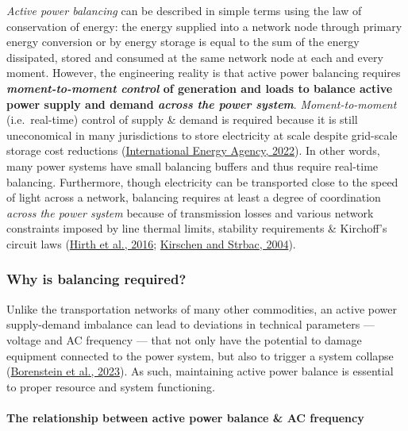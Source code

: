 \documentclass[12pt,a4paper,]{report}
\begin{document}
\emph{Active power balancing} can be described in simple terms using the
law of conservation of energy: the energy supplied into a network node
through primary energy conversion or by energy storage is equal to the
sum of the energy dissipated, stored and consumed at the same network
node at each and every moment. However, the engineering reality is that
active power balancing requires \textbf{\emph{moment-to-moment control}
of generation and loads to balance active power supply and demand
\emph{across the power system}}. \emph{Moment-to-moment}
(i.e.~real-time) control of supply \& demand is required because it is
still uneconomical in many jurisdictions to store electricity at scale
despite grid-scale storage cost reductions
(\protect\hyperlink{ref-internationalenergyagencyGridScaleStorage2022}{International
Energy Agency, 2022}). In other words, many power systems have small
balancing buffers and thus require real-time balancing. Furthermore,
though electricity can be transported close to the speed of light across
a network, balancing requires at least a degree of coordination
\emph{across the power system} because of transmission losses and
various network constraints imposed by line thermal limits, stability
requirements \& Kirchoff's circuit laws
(\protect\hyperlink{ref-hirthWhyWindNot2016a}{Hirth et al., 2016};
\protect\hyperlink{ref-kirschenFundamentalsPowerSystem2004}{Kirschen and
Strbac, 2004}).

\hypertarget{sec:lit_review-balancing_need}{%
\subsubsection{Why is balancing
required?}\label{sec:lit_review-balancing_need}}

Unlike the transportation networks of many other commodities, an active
power supply-demand imbalance can lead to deviations in technical
parameters --- voltage and AC frequency --- that not only have the
potential to damage equipment connected to the power system, but also to
trigger a system collapse
(\protect\hyperlink{ref-borensteinEconomicsElectricityReliability2023}{Borenstein
et al., 2023}). As such, maintaining active power balance is essential
to proper resource and system functioning.

\hypertarget{sec:lit_review-balancing_need-frequency}{%
\paragraph{The relationship between active power balance \& AC
frequency}\label{sec:lit_review-balancing_need-frequency}}
\end{document}
